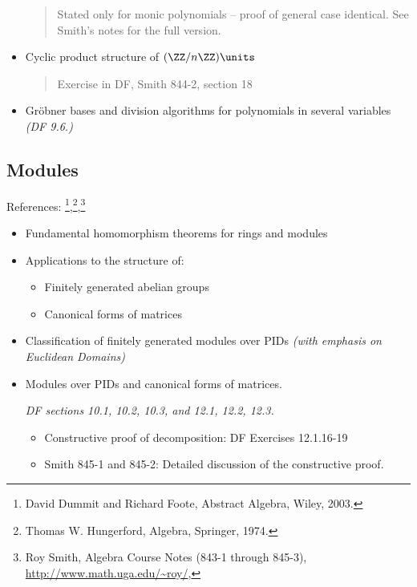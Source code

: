 \begin{itemize}
  \begin{quote}
  Stated only for monic polynomials -- proof of general case identical.
  See Smith's notes for the full version.
  \end{quote}
\item
  Cyclic product structure of \((\ZZ/n\ZZ)\units\)

  \begin{quote}
  Exercise in DF, Smith 844-2, section 18
  \end{quote}
\item
  Gröbner bases and division algorithms for polynomials in several
  variables \emph{(DF 9.6.)}
\end{itemize}

\hypertarget{modules}{%
\subsection{Modules}\label{modules}}

References: \footnote{David Dummit and Richard Foote, Abstract Algebra,
  Wiley, 2003.},\footnote{Thomas W. Hungerford, Algebra, Springer, 1974.},\footnote{Roy
  Smith, Algebra Course Notes (843-1 through 845-3),
  \url{http://www.math.uga.edu/~roy/},}

\begin{itemize}
\item
  Fundamental homomorphism theorems for rings and modules
\item
  Applications to the structure of:

  \begin{itemize}
  \tightlist
  \item
    Finitely generated abelian groups
  \item
    Canonical forms of matrices
  \end{itemize}
\item
  Classification of finitely generated modules over PIDs \emph{(with
  emphasis on Euclidean Domains)}
\item
  Modules over PIDs and canonical forms of matrices.

  \emph{DF sections 10.1, 10.2, 10.3, and 12.1, 12.2, 12.3.}

  \begin{itemize}
  \item
    Constructive proof of decomposition: DF Exercises 12.1.16-19
  \item
    Smith 845-1 and 845-2: Detailed discussion of the constructive
    proof.
  \end{itemize}
\end{itemize}

